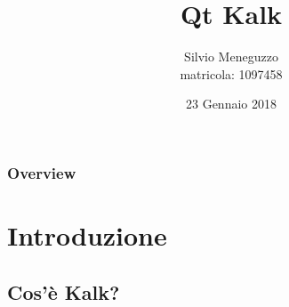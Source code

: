 \documentclass[10pt]{beamer}
\title[Space Kalc]{Qt Kalk} %
\author{Silvio Meneguzzo \\ matricola: 1097458 } %
\institute[Unipd] %
{
Università di Padova - Dipartimento di Matematica \\ %
\medskip
\textit{meneguzzosilvio@gmail.com} %
}
\date{23 Gennaio 2018} %
\begin{document}
\begin{frame}
\titlepage %
\end{frame}

\begin{frame}
\frametitle{Overview} %
\tableofcontents %
\end{frame}


\section{Introduzione} %

\subsection{Cos'è Kalk?} %
\end{document}
